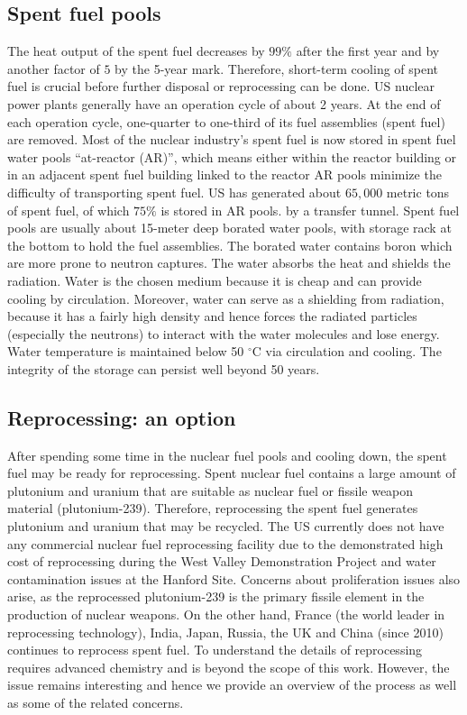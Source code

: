 \documentclass[nofootinbib,preprint,aps]{revtex4-1}
\begin{document}
    \subsection{Spent fuel pools}
    The heat output of the spent fuel decreases by $99\%$ after the first year and by another factor of $5$
    by the 5-year mark.\cite{aa12} Therefore, short-term cooling of spent fuel is crucial before
    further disposal or reprocessing can be done.
    US nuclear power plants generally have an operation cycle of about 2 years. At the end of each operation cycle,
    one-quarter to one-third of its fuel assemblies (spent fuel) are removed.
    Most of the nuclear industry's spent fuel is now stored in spent fuel water pools ``at-reactor (AR)'',
    which means either within the reactor building or in an adjacent spent fuel building linked to the reactor
    AR pools minimize the difficulty of transporting spent fuel.\cite{iaea99}
    US has generated about $65,000$ metric tons of spent fuel, of which $75\%$ is stored in AR pools.\cite{a11}
    by a transfer tunnel. 
    Spent fuel pools  are usually about 15-meter deep borated water pools, with storage rack at the bottom to hold the fuel assemblies.
    The borated water contains boron which are more prone to neutron captures.
    The water absorbs the heat and shields the radiation. Water is the chosen medium because it is cheap and
    can provide cooling by circulation. Moreover, water can serve as a shielding from radiation, because it has a
    fairly high density and hence forces the radiated particles (especially the neutrons) to interact with
    the water molecules and lose energy. Water temperature is maintained
    below 50 $^\circ$C via circulation and cooling. The integrity of the storage can persist well beyond 
    50 years.\cite{a11, iaea99}

    \subsection{Reprocessing: an option}
    \label{sec:reproc}
    After spending some time in the nuclear fuel pools and cooling down, the spent fuel may be ready
    for reprocessing.
    Spent nuclear fuel contains a large amount of plutonium and uranium that are suitable as nuclear fuel
    or fissile weapon material (plutonium-239). Therefore, reprocessing the spent fuel generates plutonium and
    uranium that may be recycled. The US currently does not have any commercial nuclear fuel
    reprocessing facility due to the demonstrated high cost of reprocessing
    during the West Valley Demonstration Project and water contamination issues at the Hanford Site.
    Concerns about proliferation issues also arise, as the 
    reprocessed plutonium-239 is the primary fissile element in the production of nuclear weapons.\cite{aa12}
    On the other hand, France (the world leader in reprocessing technology), India, Japan, Russia, the UK
    and China (since 2010) continues to reprocess spent fuel. To understand the details of reprocessing
    requires advanced chemistry and is beyond the scope of this work. However, the issue remains interesting
    and hence we provide an overview of the process as well as some of the related concerns.
\end{document}
